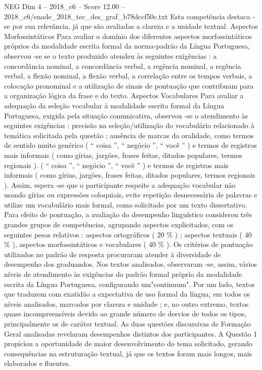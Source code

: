 \begin{textsample}{NEG Dim 4 – 2018\_c6 – Score 12.00 – 2018\_c6/enade\_2018\_tec\_des\_graf\_b78dccf50c.txt}
Esta competência destaca -se por sua relevância, já que são avaliadas a clareza e a unidade textual.
Aspectos Morfossintáticos Para avaliar o domínio dos diferentes aspectos morfossintáticos próprios da modalidade escrita formal da norma-padrão da Língua Portuguesa, observou -se se o texto produzido atendeu às seguintes exigências : a concordância nominal, a concordância verbal, a regência nominal, a regência verbal, a flexão nominal, a flexão verbal, a correlação entre os tempos verbais, a colocação pronominal e a utilização de sinais de pontuação que contribuam para a organização lógica da frase e do texto.
Aspectos Vocabulares Para avaliar a adequação da seleção vocabular à modalidade escrita formal da Língua Portuguesa, exigida pela situação comunicativa, observou -se o atendimento às seguintes exigências : precisão na seleção/utilização do vocabulário relacionado à temática solicitada pela questão ; ausência de marcas da oralidade, como termos de sentido muito genérico ( “ coisa ”, “ negócio ”, “ você ” ) e termos de registros mais informais ( como gírias, jargões, frases feitas, ditados populares, termos regionais ). ( “ coisa ”, “ negócio ”, “ você ” ) e termos de registros mais informais ( como gírias, jargões, frases feitas, ditados populares, termos regionais ).
Assim, espera -se que o participante respeite a adequação vocabular não usando gírias ou expressões coloquiais, evite repetição desnecessária de palavras e utilize um vocabulário mais formal, como solicitado por um texto dissertativo.
Para efeito de pontuação, a avaliação do desempenho linguístico considerou três grandes grupos de competências, agrupando aspectos explicitados, com os seguintes pesos relativos : aspectos ortográficos ( 20 \% ) ; aspectos textuais ( 40 \% ), aspectos morfossintáticos e vocabulares ( 40 \% ).
Os critérios de pontuação utilizados no padrão de resposta procuraram atender à diversidade de desempenho dos graduandos.
Nos textos analisados, observaram -se, assim, vários níveis de atendimento às exigências do padrão formal próprio da modalidade escrita da Língua Portuguesa, configurando um"continuum".
Por um lado, textos que traduzem com exatidão a expectativa de uso formal da língua, em todos os níveis analisados, marcados por clareza e unidade ; e, no outro extremo, textos quase incompreensíveis devido ao grande número de desvios de todos os tipos, principalmente os de caráter textual.
As duas questões discursivas de Formação Geral analisadas revelaram desempenhos distintos dos participantes.
A Questão 1 propiciou a oportunidade de maior desenvolvimento do tema solicitado, gerando consequências na estruturação textual, já que os textos foram mais longos, mais elaborados e fluentes.

\end{textsample}
